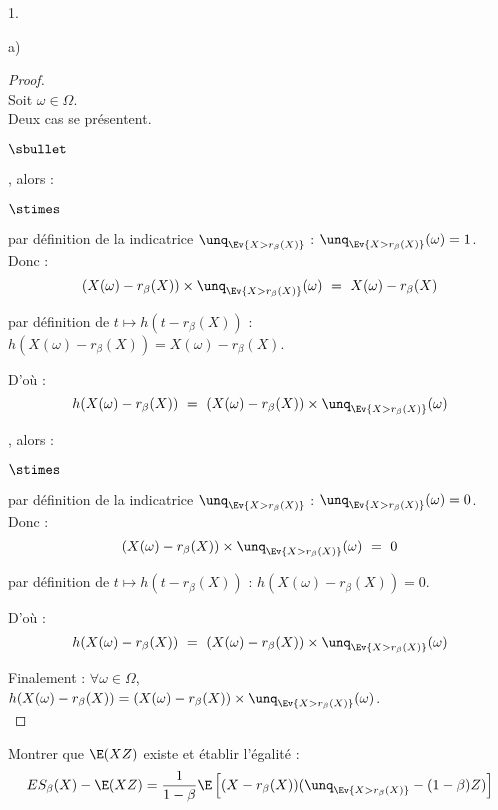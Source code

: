\begin{noliste}{1.}
\begin{noliste}{a)}
    \begin{proof}~\\
      Soit $\omega \in \Omega$.\\
      Deux cas se présentent.
      \begin{noliste}{$\sbullet$}
	\item {}, alors :
	\begin{noliste}{$\stimes$}
	  \item par définition de la \var indicatrice $\unq_{\Ev{ X >
	  r_\beta(X)}}$ : $\unq_{\Ev{ X> r_\beta(X)}}(\omega) = 1$.\\
	  Donc :
	  \[
	    (X(\omega) - r_\beta(X)) \times \unq_{\Ev{ X > r_\beta(X)}}
	    (\omega) \ = \ X(\omega) - r_\beta(X)
	  \]
	  
	  \item par définition de $t \mapsto h(t- r_\beta(X))$ : 
	  $h(X(\omega) - r_\beta(X)) = X(\omega) - r_\beta(X)$.
	\end{noliste}
	D'où :
	\[
	  h(X(\omega) - r_\beta(X)) \ = \ (X(\omega) - r_\beta(X))
	  \times \unq_{\Ev{ X> r_\beta(X)}}(\omega)
	\]
	
	\item {}, alors :
	\begin{noliste}{$\stimes$}
	  \item par définition de la \var indicatrice $\unq_{\Ev{ X >
	  r_\beta(X)}}$ : $\unq_{\Ev{ X> r_\beta(X)}}(\omega) = 0$.\\
	  Donc :
	  \[
	    (X(\omega) - r_\beta(X)) \times \unq_{\Ev{ X > r_\beta(X)}}
	    (\omega) \ = \ 0
	  \]
	  
	  \item par définition de $t \mapsto h(t- r_\beta(X))$ : 
	  $h(X(\omega) - r_\beta(X)) = 0$.
	\end{noliste}
	
	
	\newpage
	
	
	D'où :
	\[
	  h(X(\omega) - r_\beta(X)) \ = \ (X(\omega) - r_\beta(X))
	  \times \unq_{\Ev{ X> r_\beta(X)}}(\omega)
	\]
      \end{noliste}
      Finalement : $\forall \omega \in \Omega$, $h(X(\omega) - 
      r_\beta(X)) = (X(\omega)- r_\beta(X)) \times \unq_{\Ev{X > 
      r_\beta(X)}}(\omega)$.
      ~\\[-1cm]
    \end{proof}

    
    \item Montrer que $\E(XZ)$ existe et établir l'égalité :
    \[
    ES_\beta(X) -\E(XZ) = \dfrac{1}{1-\beta} \E\left[(X-r_\beta(X))
      (\unq_{\Ev{X > r_\beta(X)}}-(1-\beta)Z)\right]
    \]
    

\end{noliste}
\end{noliste}
